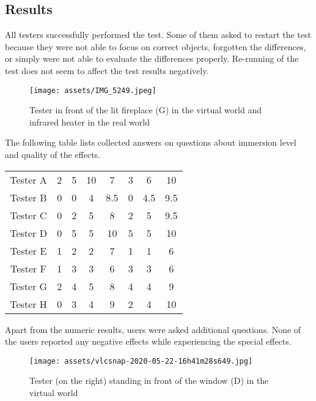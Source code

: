 \hypertarget{x-results}{\subsection{Results}}
All testers successfully performed the test. Some of them asked to
restart the test because they were not able to focus on correct objects,
forgotten the differences, or simply were not able to evaluate the
differences properly. Re-running of the test does not seem to affect the
test results negatively.


\begin{figure}[h]{}
\centering\texttt{[image: assets/IMG\_5249.jpeg]}
\caption{Tester in front of the lit fireplace (G) in the virtual world and infrared heater in the real world}

\end{figure}

The following table lists collected answers on questions about immersion level and
quality of the effects.


\begin{center}
\begin{tabular}{|c|c|c|c|c|c|c|c|}
\hline
Tester A & 2 & 5 & 10 & 7 & 3 & 6 & 10 \\ 
Tester B & 0 & 0 & 4 & 8.5 & 0 & 4.5 & 9.5 \\ 
Tester C & 0 & 2 & 5 & 8 & 2 & 5 & 9.5 \\ 
Tester D & 0 & 5 & 5 & 10 & 5 & 5 & 10 \\ 
Tester E & 1 & 2 & 2 & 7 & 1 & 1 & 6 \\ 
Tester F & 1 & 3 & 3 & 6 & 3 & 3 & 6 \\ 
Tester G & 2 & 4 & 5 & 8 & 4 & 4 & 9 \\ 
Tester H & 0 & 3 & 4 & 9 & 2 & 4 & 10 \\ 
\hline
\end{tabular}
\end{center}

Apart from the numeric results, users were asked additional questions.
None of the users reported any negative effects while experiencing the special
effects.


\begin{figure}[h]{}
\centering\texttt{[image: assets/vlcsnap-2020-05-22-16h41m28s649.jpg]}
\caption{Tester (on the right) standing in front of the window (D) in the virtual world}

\end{figure}

